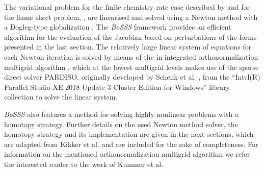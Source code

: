 The variational problem for the finite chemistry rate case described by  and for the flame sheet problem, , are linearised and solved using a Newton method with a Dogleg-type globalization \cite{pawlowskiGlobalizationTechniquesNewton2006,pawlowskiInexactNewtonDogleg2008}. The \textit{BoSSS} framework provides an efficient algorithm for the evaluation of the Jacobian based on perturbations of the forms presented in the last section.
The relatively large linear system of equations for each Newton iteration is solved by means of the in \BoSSS integrated orthonormalization multigrid algorithm \cite{kummerBoSSSPackageMultigrid2021}, which at the lowest multigrid levels makes use of the sparse direct solver PARDISO, originally developed by Schenk et al. \cite{schenkEfficientSparseLU2000,schenkTwolevelDynamicScheduling2002,schenkSolvingUnsymmetricSparse2004a},
from the ``Intel(R) Parallel Studio XE 2018 Update 3 Cluster Edition for Windows'' library collection to solve the linear system. 

\textit{BoSSS} also features a method for solving highly nonlinear problems with a homotopy strategy.
Further details on the used Newton method solver, the homotopy strategy and its implementation are given in the next sections, which are adapted from Kikker et al.\cite{kikkerFullyCoupledHighorder}  and are included for the sake of completeness. For information on the mentioned orthonormalization multigrid algorithm we refer the interested reader to the work of Kummer et al. \cite{kummerBoSSSPackageMultigrid2021}

